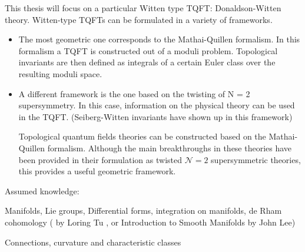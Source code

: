 This thesis will focus on a particular Witten type TQFT: Donaldson-Witten
theory. Witten-type TQFTs can be formulated in a variety of frameworks. 
\begin{itemize}
	\item 
 The most geometric one corresponds to the Mathai-Quillen formalism. In this
formalism a TQFT is constructed out of a moduli problem. Topological invariants
are then defined as integrals of a certain Euler class over the resulting moduli
space.\cite{cernTQFT}
	\item 
 A different framework is the one based on the twisting of N = 2 supersymmetry.
In this case, information on the physical theory can be used in the
TQFT. (Seiberg-Witten invariants have shown up in this framework)

Topological quantum fields theories can be constructed based on the
Mathai-Quillen formalism. Although the main breakthroughs in these theories have
been provided in their formulation as twisted $\mathcal{N}=2$ supersymmetric
theories, this provides a useful geometric framework.\cite{TQFTbook}


\end{itemize}



Assumed knowledge:

Manifolds, Lie groups, Differential forms, integration on manifolds, de Rham cohomology
( by Loring Tu \cite{intro_tu}, or Introduction to Smooth Manifolds by
John Lee) 

Connections, curvature and characteristic classes \cite{loringtu}

\begin{comment}
	For supersymmetry chapter: 
	\citetitle{hall} \citet{hall}
\end{comment}
